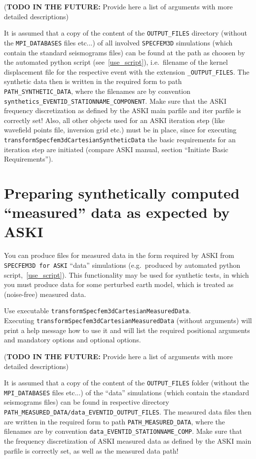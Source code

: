 \documentclass[12pt,a4paper]{article}
\newcommand{\lcode}[1]{\nolinkurl{#1}}
\newcommand{\ASKI}{ {\ttfamily ASKI} }
\begin{document}
({\bf TODO IN THE FUTURE:} Provide here a list of arguments with more detailed descriptions)

It is assumed that a copy of the content of the \lcode{OUTPUT_FILES} directory 
(without the \lcode{MPI_DATABASES} files etc...)
of all involved \lcode{SPECFEM3D} simulations (which contain the standard seismograms files) can be found at 
the path as choosen by the automated python script (see~\ref{use_script}), i.e.\ filename of the kernel 
displacement file for the respective event with the extension \lcode{_OUTPUT_FILES}. 
The synthetic data then is written in the required form to path \lcode{PATH_SYNTHETIC_DATA}, where the 
filenames are by convention \lcode{synthetics_EVENTID_STATIONNAME_COMPONENT}. Make sure that the \ASKI frequency 
discretization as defined by the \ASKI main parfile and iter parfile is correctly set! Also, all other objects
used for an \ASKI iteration step (like wavefield points file, inversion grid etc.) must be in place, since
for executing \lcode{transformSpecfem3dCartesianSyntheticData} the basic requirements for an iteration step
are initiated (compare \ASKI manual, section ``Initiate Basic Requirements'').
%
\section{Preparing synthetically computed ``measured'' data as expected by \ASKI}
%
You can produce files for measured data in the form required by \ASKI from \lcode{SPECFEM3D for ASKI} ``data'' 
simulations (e.g.\ produced by automated python script,~\ref{use_script}). This functionality may
be used for synthetic tests, in which you must produce data for some perturbed earth model, which 
is treated as (noise-free) measured data.

Use executable \lcode{transformSpecfem3dCartesianMeasuredData}. \\
Executing \lcode{transformSpecfem3dCartesianMeasuredData} (without arguments) 
will print a help message how to use it and will list the required positional 
arguments and mandatory options and optional options.

({\bf TODO IN THE FUTURE:} Provide here a list of arguments with more detailed descriptions)

It is assumed that a copy of the content of the \lcode{OUTPUT_FILES} folder 
(without the \lcode{MPI_DATABASES} files etc...)
of the ``data'' simulations (which contain the standard seismograms files) can be found in respective
directory \lcode{PATH_MEASURED_DATA/data_EVENTID_OUTPUT_FILES}. 
The measured data files then are written in the required form to path \lcode{PATH_MEASURED_DATA}, where the filenames are by
convention \lcode{data_EVENTID_STATIONNAME_COMP}. 
Make sure that the frequency discretization of \ASKI measured data as defined by the \ASKI main parfile 
is correctly set, as well as the measured data path!
%
\end{document}
